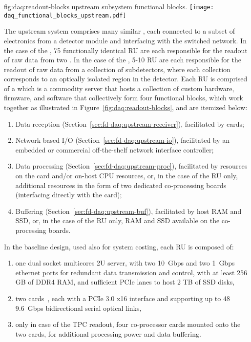 \begin{dunefigure}{fig:daq:readout-blocks}{ upstream
     subsystem functional blocks.}
  \texttt{[image: daq\_functional\_blocks\_upstream.pdf]}
\end{dunefigure}

The upstream  system comprises many similar , each
connected to a subset of electronics from a detector module and
interfacing with the  switched network. In the case of the
, 75 functionally identical RU are each responsible for the readout of raw data from two
. In the case of the , 5-10 RU are each responsible for the
readout of raw data from a collection of  subdetectors, where each
collection corresponds to an optically isolated region in the
detector. 
Each RU is comprised of a  which is a commodity server that hosts a
collection of custom hardware, 
firmware, and software that collectively form four functional blocks,
which work together 
as illustrated in Figure~\ref{fig:daq:readout-blocks}, and are
itemized below:

\begin{enumerate}
\item Data reception (Section~\ref{sec:fd-daq:upstream-receiver}), facilitated by  cards;
\item Network based I/O (Section~\ref{sec:fd-daq:upstream-io}), facilitated by an embedded or commercial off-the-shelf network interface controller;
\item Data processing (Section~\ref{sec:fd-daq:upstream-proc}), facilitated by  resources on the 
  card and/or on-host CPU resources, or, in the case of the  RU only,
  additional  resources in the form of two dedicated co-processing
  boards (interfacing directly with the  card); 
\item Buffering (Section~\ref{sec:fd-daq:upstream-buf}), facilitated by host RAM and SSD, or, in
  the case of the  RU only, RAM
  and SSD available on the co-processing boards.
\end{enumerate}

In the baseline design, used also for system costing, each RU is composed of:
\begin{enumerate}
\item one dual socket multicores 2U server, with two \SI{10}{Gbps} and two \SI{1}{Gbps} ethernet ports for redundant data transmission and control, with at least 256 GB of DDR4 RAM, and sufficient PCIe lanes to host 2 TB of SSD disks,
\item two  cards~\cite{atlas-felix}, each with a PCIe 3.0 x16 interface and supporting up to 48 \SI{9.6}{Gbps} bidirectional serial optical links,
\item only in case of the TPC readout, four co-processor cards mounted onto the two  cards, for additional processing power and data buffering.

\end{enumerate}

